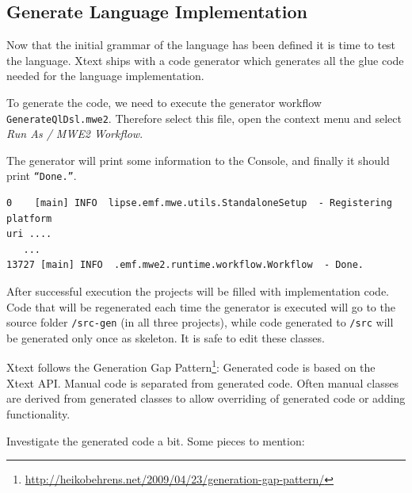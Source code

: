 \subsection{Generate Language Implementation}

Now that the initial grammar of the language has been defined it is time to test
the language. Xtext ships with a code generator which generates all the glue
code needed for the language implementation.

To generate the code, we need to execute the generator workflow
\texttt{GenerateQlDsl.mwe2}. Therefore select this file, open the context menu
and select \emph{Run As / MWE2 Workflow}.

The generator will print some information to the Console, and finally it should
print \texttt{``Done.''}.

\begin{lstlisting}
0    [main] INFO  lipse.emf.mwe.utils.StandaloneSetup  - Registering platform
uri ....
   ...
13727 [main] INFO  .emf.mwe2.runtime.workflow.Workflow  - Done.
\end{lstlisting}

After successful execution the projects will be filled with implementation code.
Code that will be regenerated each time the generator is executed will go to the
source folder \texttt{/src-gen} (in all three projects), while code generated to
\texttt{/src} will be generated only once as skeleton. It is safe to edit these
classes.

Xtext follows the Generation Gap
Pattern\footnote{\url{http://heikobehrens.net/2009/04/23/generation-gap-pattern/}}:
Generated code is based on the Xtext API. Manual code is separated from
generated code. Often manual classes are derived from generated classes to allow
overriding of generated code or adding functionality.

Investigate the generated code a bit. Some pieces to mention:

